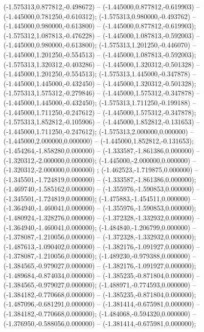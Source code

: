  (-1.575313,0.877812,-0.498672) -- (-1.445000,0.877812,-0.619903) -- (-1.445000,0.781250,-0.610312);
 (-1.575313,0.980000,-0.493762) -- (-1.445000,0.980000,-0.613800) -- (-1.445000,0.877812,-0.619903);
 (-1.575312,1.087813,-0.476228) -- (-1.445000,1.087813,-0.592003) -- (-1.445000,0.980000,-0.613800);
 (-1.575313,1.201250,-0.446070) -- (-1.445000,1.201250,-0.554513) -- (-1.445000,1.087813,-0.592003);
 (-1.575313,1.320312,-0.403286) -- (-1.445000,1.320312,-0.501328) -- (-1.445000,1.201250,-0.554513);
 (-1.575313,1.445000,-0.347878) -- (-1.445000,1.445000,-0.432450) -- (-1.445000,1.320312,-0.501328);
 (-1.575313,1.575312,-0.279846) -- (-1.445000,1.575312,-0.347878) -- (-1.445000,1.445000,-0.432450);
 (-1.575313,1.711250,-0.199188) -- (-1.445000,1.711250,-0.247612) -- (-1.445000,1.575312,-0.347878);
 (-1.575313,1.852812,-0.105906) -- (-1.445000,1.852812,-0.131653) -- (-1.445000,1.711250,-0.247612);
 (-1.575313,2.000000,0.000000) -- (-1.445000,2.000000,0.000000) -- (-1.445000,1.852812,-0.131653);
 (-1.454264,-1.858280,0.000000) -- (-1.333587,-1.861386,0.000000) -- (-1.320312,-2.000000,0.000000);
 (-1.445000,-2.000000,0.000000) -- (-1.320312,-2.000000,0.000000) ;
 (-1.462523,-1.719875,0.000000) -- (-1.345501,-1.724819,0.000000) -- (-1.333587,-1.861386,0.000000);
 (-1.469740,-1.585162,0.000000) -- (-1.355976,-1.590853,0.000000) -- (-1.345501,-1.724819,0.000000);
 (-1.475883,-1.454511,0.000000) -- (-1.364940,-1.460041,0.000000) -- (-1.355976,-1.590853,0.000000);
 (-1.480924,-1.328276,0.000000) -- (-1.372328,-1.332932,0.000000) -- (-1.364940,-1.460041,0.000000);
 (-1.484840,-1.206799,0.000000) -- (-1.378087,-1.210056,0.000000) -- (-1.372328,-1.332932,0.000000);
 (-1.487613,-1.090402,0.000000) -- (-1.382176,-1.091927,0.000000) -- (-1.378087,-1.210056,0.000000);
 (-1.489230,-0.979388,0.000000) -- (-1.384565,-0.979027,0.000000) -- (-1.382176,-1.091927,0.000000);
 (-1.489684,-0.874034,0.000000) -- (-1.385235,-0.871804,0.000000) -- (-1.384565,-0.979027,0.000000);
 (-1.488971,-0.774593,0.000000) -- (-1.384182,-0.770668,0.000000) -- (-1.385235,-0.871804,0.000000);
 (-1.487096,-0.681291,0.000000) -- (-1.381414,-0.675981,0.000000) -- (-1.384182,-0.770668,0.000000);
 (-1.484068,-0.594320,0.000000) -- (-1.376950,-0.588056,0.000000) -- (-1.381414,-0.675981,0.000000);
